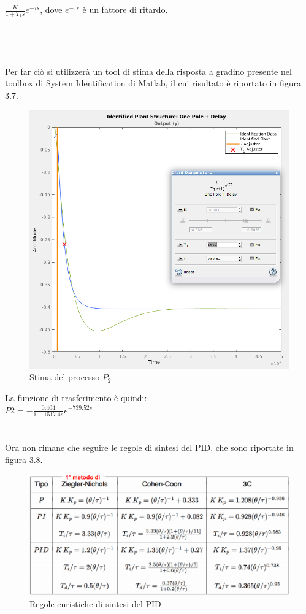 \documentclass[Lau,noexaminfo]{sapthesis}
\begin{document}
 	$\frac{K}{1+T_1 s} e^{-\tau s}$, dove $e^{-\tau s}$ è un fattore di ritardo.\\\\\\\\\\Per far ciò si utilizzerà un tool di stima della risposta a gradino presente nel toolbox di System Identification di Matlab, il cui risultato è riportato in figura 3.7.
 	\begin{figure}
 		\centering
 		\includegraphics[scale=0.45]{P2_estimating1}
 		\caption{Stima del processo $P_2$}
 	\end{figure}
	La funzione di trasferimento è quindi:\\
	$P2=-\frac{0.404}{1+1517.4s}e^{-739.52s}$\\\\\\
	Ora non rimane che seguire le regole di sintesi del PID, che sono riportate in figura 3.8.
	\begin{figure}
		\centering
		\includegraphics[height=0.27\textheight,]{Regole_PID}
		\caption{Regole euristiche di sintesi del PID}
	\end{figure}
\end{document}
